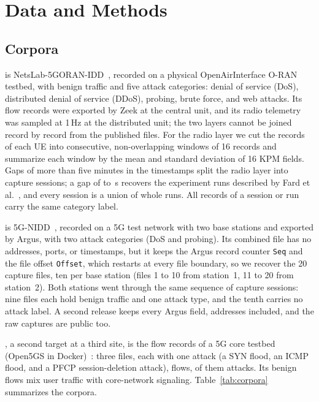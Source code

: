 \section{Data and Methods}
\label{sec:method}

\subsection{Corpora}
\label{sec:corpora}

\DA{} is NetsLab-5GORAN-IDD~\cite{abedzadeh2025netslab}, recorded on a physical OpenAirInterface O-RAN testbed, with benign traffic and five attack categories: denial of service (DoS), distributed denial of service (DDoS), probing, brute force, and web attacks. Its flow records were exported by Zeek at the central unit, and its radio telemetry was sampled at 1\,Hz at the distributed unit; the two layers cannot be joined record by record from the published files. For the radio layer we cut the records of each UE into consecutive, non-overlapping windows of 16 records and summarize each window by the mean and standard deviation of 16 KPM fields. Gaps of more than five minutes in the timestamps split the radio layer into \NSessions{} capture sessions; a gap of \SessRunGapMin{} to \SessRunGapMax{}\,s recovers the \SessRunN{} experiment runs described by Fard et al.~\cite{fard2026crosslayer}, and every session is a union of whole runs. All records of a session or run carry the same category label.

\DB{} is 5G-NIDD~\cite{samarakoon2022nidd,siriwardhana2025descriptor}, recorded on a 5G test network with two base stations and exported by Argus, with two attack categories (DoS and probing). Its combined file has no addresses, ports, or timestamps, but it keeps the Argus record counter \texttt{Seq} and the file offset \texttt{Offset}, which restarts at every file boundary, so we recover the 20 capture files, ten per base station (files 1 to 10 from station~1, 11 to 20 from station~2). Both stations went through the same sequence of capture sessions: nine files each hold benign traffic and one attack type, and the tenth carries no attack label. A second release keeps every Argus field, addresses included, and the raw captures are public too.

\DC{}, a second target at a third site, is the flow records of a 5G core testbed (Open5GS in Docker)~\cite{nugraha2025fivegdatasets}: three files, each with one attack (a SYN flood, an ICMP flood, and a PFCP session-deletion attack), \ThNflows{} flows, \ThNattack{} of them attacks. Its benign flows mix user traffic with core-network signaling. Table~\ref{tab:corpora} summarizes the corpora.

